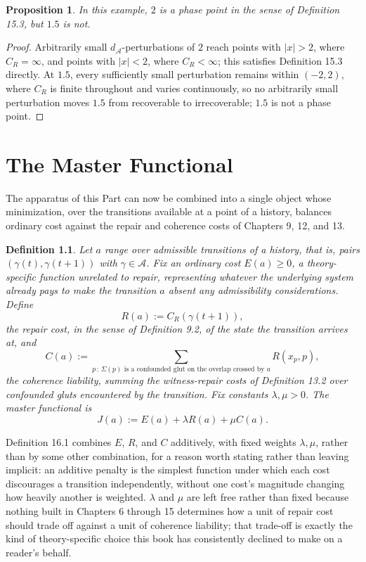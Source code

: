 \documentclass[11pt]{book}
\newtheorem{definition}[theorem]{Definition}
\newtheorem{proposition}[theorem]{Proposition}
\begin{document}
\begin{proposition}
In this example, $2$ is a phase point in the sense of Definition 15.3, but $1.5$ is not.
\end{proposition}

\begin{proof}
Arbitrarily small $d_{\mathcal A}$-perturbations of $2$ reach points with $|x|>2$, where $C_R=\infty$, and points with $|x|<2$, where $C_R<\infty$; this satisfies Definition 15.3 directly. At $1.5$, every sufficiently small perturbation remains within $(-2,2)$, where $C_R$ is finite throughout and varies continuously, so no arbitrarily small perturbation moves $1.5$ from recoverable to irrecoverable; $1.5$ is not a phase point.
\end{proof}

\chapter{The Master Functional}

The apparatus of this Part can now be combined into a single object whose minimization, over the transitions available at a point of a history, balances ordinary cost against the repair and coherence costs of Chapters 9, 12, and 13.

\begin{definition}
Let $a$ range over admissible transitions of a history, that is, pairs $(\gamma(t), \gamma(t+1))$ with $\gamma \in \mathcal A$. Fix an \emph{ordinary cost} $E(a) \geq 0$, a theory-specific function unrelated to repair, representing whatever the underlying system already pays to make the transition $a$ absent any admissibility considerations. Define
\[
R(a) := C_R(\gamma(t+1)),
\]
the repair cost, in the sense of Definition 9.2, of the state the transition arrives at, and
\[
C(a) := \sum_{p \,:\, \Sigma(p) \text{ is a confounded glut on the overlap crossed by } a} R(x_p, p),
\]
the coherence liability, summing the witness-repair costs of Definition 13.2 over confounded gluts encountered by the transition. Fix constants $\lambda, \mu > 0$. The \emph{master functional} is
\[
J(a) := E(a) + \lambda R(a) + \mu C(a).
\]
\end{definition}

Definition 16.1 combines $E$, $R$, and $C$ additively, with fixed weights $\lambda,\mu$, rather than by some other combination, for a reason worth stating rather than leaving implicit: an additive penalty is the simplest function under which each cost discourages a transition independently, without one cost's magnitude changing how heavily another is weighted. $\lambda$ and $\mu$ are left free rather than fixed because nothing built in Chapters 6 through 15 determines how a unit of repair cost should trade off against a unit of coherence liability; that trade-off is exactly the kind of theory-specific choice this book has consistently declined to make on a reader's behalf.
\end{document}
